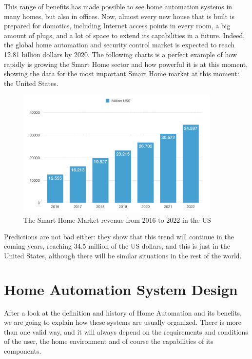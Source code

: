 This range of benefits has made possible to see home automation systems in many homes, but also in offices. Now, almost
every new house that is built is prepared for domotics, including Internet access points in every room, a big amount of plugs,
and a lot of space to extend its capabilities in a future. Indeed, the global home automation and security control market is
expected to reach 12.81 billion dollars by 2020.\cite{reutersResearchMarkets} The following charts is a perfect example of how
rapidly is growing the Smart Home sector and how powerful it is at this moment, showing the data for the most important Smart
Home market at this moment: the United States.

\begin{figure}
	\centering
	\includegraphics[width=0.9\textwidth]{images/Chapter_02/sh-market-revenue.png}
	\caption{The Smart Home Market revenue from 2016 to 2022 in the US\cite{statistaSmartHomeUS}}
	\label{fig:sh-market-revenue}
\end{figure}

Predictions are not bad either: they show that this trend will continue in the coming years, reaching 34.5 million of the
US dollars, and this is just in the United States, although there will be similar situations in the rest of the world.

\bigskip
\section{Home Automation System Design}
After a look at the definition and history of Home Automation and its benefits, we are going to explain how these systems are
usually organized. There is more than one valid way, and it will always depend on the requirements and conditions of the user,
the home environment and of course the capabilities of its components.


